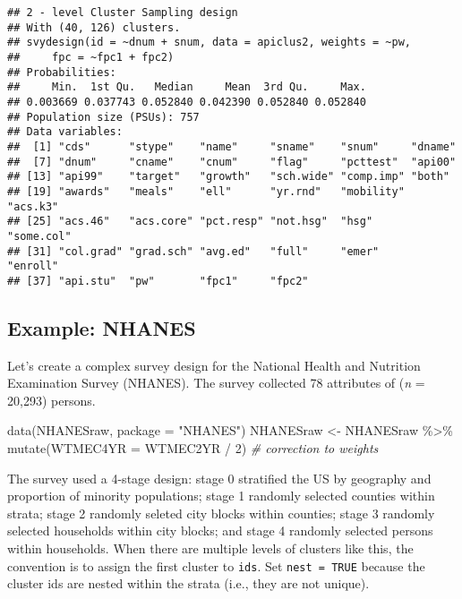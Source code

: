 \documentclass[
]{book}
\newenvironment{Shaded}{\begin{snugshade}}{\end{snugshade}}
\newcommand{\AttributeTok}[1]{\textcolor[rgb]{0.77,0.63,0.00}{#1}}
\newcommand{\CommentTok}[1]{\textcolor[rgb]{0.56,0.35,0.01}{\textit{#1}}}
\newcommand{\DecValTok}[1]{\textcolor[rgb]{0.00,0.00,0.81}{#1}}
\newcommand{\FunctionTok}[1]{\textcolor[rgb]{0.00,0.00,0.00}{#1}}
\newcommand{\NormalTok}[1]{#1}
\newcommand{\OtherTok}[1]{\textcolor[rgb]{0.56,0.35,0.01}{#1}}
\newcommand{\SpecialCharTok}[1]{\textcolor[rgb]{0.00,0.00,0.00}{#1}}
\newcommand{\StringTok}[1]{\textcolor[rgb]{0.31,0.60,0.02}{#1}}
\theoremstyle{definition}
\theoremstyle{definition}
\theoremstyle{definition}
\theoremstyle{definition}
\theoremstyle{remark}
\begin{document}
\begin{verbatim}
## 2 - level Cluster Sampling design
## With (40, 126) clusters.
## svydesign(id = ~dnum + snum, data = apiclus2, weights = ~pw, 
##     fpc = ~fpc1 + fpc2)
## Probabilities:
##     Min.  1st Qu.   Median     Mean  3rd Qu.     Max. 
## 0.003669 0.037743 0.052840 0.042390 0.052840 0.052840 
## Population size (PSUs): 757 
## Data variables:
##  [1] "cds"      "stype"    "name"     "sname"    "snum"     "dname"   
##  [7] "dnum"     "cname"    "cnum"     "flag"     "pcttest"  "api00"   
## [13] "api99"    "target"   "growth"   "sch.wide" "comp.imp" "both"    
## [19] "awards"   "meals"    "ell"      "yr.rnd"   "mobility" "acs.k3"  
## [25] "acs.46"   "acs.core" "pct.resp" "not.hsg"  "hsg"      "some.col"
## [31] "col.grad" "grad.sch" "avg.ed"   "full"     "emer"     "enroll"  
## [37] "api.stu"  "pw"       "fpc1"     "fpc2"
\end{verbatim}

\hypertarget{example-nhanes}{%
\subsection{Example: NHANES}\label{example-nhanes}}

Let's create a complex survey design for the National Health and Nutrition Examination Survey (NHANES). The survey collected 78 attributes of (\emph{n} = 20,293) persons.

\begin{Shaded}
\begin{Highlighting}[]
\FunctionTok{data}\NormalTok{(NHANESraw, }\AttributeTok{package =} \StringTok{"NHANES"}\NormalTok{)}
\NormalTok{NHANESraw }\OtherTok{\textless{}{-}}\NormalTok{ NHANESraw }\SpecialCharTok{\%\textgreater{}\%} 
  \FunctionTok{mutate}\NormalTok{(}\AttributeTok{WTMEC4YR =}\NormalTok{ WTMEC2YR }\SpecialCharTok{/} \DecValTok{2}\NormalTok{) }\CommentTok{\# correction to weights}
\end{Highlighting}
\end{Shaded}

The survey used a 4-stage design: stage 0 stratified the US by geography and proportion of minority populations; stage 1 randomly selected counties within strata; stage 2 randomly seleted city blocks within counties; stage 3 randomly selected households within city blocks; and stage 4 randomly selected persons within households. When there are multiple levels of clusters like this, the convention is to assign the first cluster to \texttt{ids}. Set \texttt{nest\ =\ TRUE} because the cluster ids are nested within the strata (i.e., they are not unique).
\end{document}
